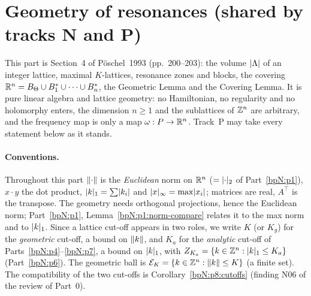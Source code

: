 \section{Geometry of resonances (shared by tracks N and P)}\label{bpN:p8}
\providecommand{\Eb}{\mathcal E}
\providecommand{\Pj}{\Pi}
\providecommand{\Q}{\mathbb Q}
\begingroup\sloppy

This part is Section~4 of P\"oschel~1993 (pp.~200--203): the volume $\lvert \Lambda\rvert$ of an integer lattice, maximal $K$-lattices, resonance zones and blocks, the covering $\mathbb{R}^n=B_\Theta\cup B_1^*\cup\dots\cup B_n^*$, the Geometric Lemma and the Covering Lemma. It is pure linear algebra and lattice geometry: no Hamiltonian, no regularity and no holomorphy enters, the dimension $n\ge1$ and the sublattices of $\mathbb{Z}^n$ are arbitrary, and the frequency map is only a map $\omega:P\to\mathbb{R}^n$. Track~P may take every statement below as it stands.

\paragraph{Conventions.} Throughout this part $\lVert \cdot\rVert$ is the \emph{Euclidean} norm on $\mathbb{R}^n$ ($=\lvert \cdot\rvert_2$ of Part~\ref{bpN:p1}), $x\cdot y$ the dot product, $\lvert k\rvert_1=\sum\lvert k_i\rvert$ and $\lvert x\rvert_\infty=\max\lvert x_i\rvert$; matrices are real, $A^\top$ is the transpose. The geometry needs orthogonal projections, hence the Euclidean norm; Part~\ref{bpN:p1}, Lemma~\ref{bpN:p1:norm-compare} relates it to the max norm and to $\lvert k\rvert_1$. Since a lattice cut-off appears in two roles, we write $K$ (or $K_g$) for the \emph{geometric} cut-off, a bound on $\lVert k\rVert$, and $K_a$ for the \emph{analytic} cut-off of Parts~\ref{bpN:p4}--\ref{bpN:p7}, a bound on $\lvert k\rvert_1$, with $Z_{K_a}=\{k\in\mathbb{Z}^n:\lvert k\rvert_1\le K_a\}$ (Part~\ref{bpN:p6}). The geometric ball is $\Eb_K=\{k\in\Z^n:\norm k\le K\}$ (a finite set). The compatibility of the two cut-offs is Corollary~\ref{bpN:p8:cutoffs} (finding N06 of the review of Part~0).

